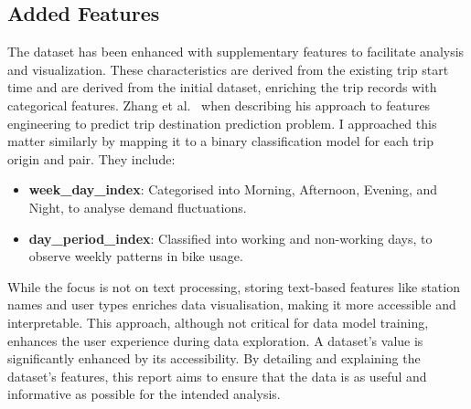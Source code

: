 \subsection{Added Features}\label{subsec:added-features}
The dataset has been enhanced with supplementary features to facilitate analysis and visualization. These characteristics are derived from the existing trip start time and are derived from the initial dataset, enriching the trip records with categorical features.
Zhang et al.~\cite{2016} when describing his approach to features engineering to predict trip destination prediction problem. I approached this matter similarly by mapping it to a binary classification model for each trip origin and pair.\newline
They include:\newline

\begin{itemize}
    \item \textbf{week\_day\_index}: Categorised into Morning, Afternoon, Evening, and Night, to analyse demand fluctuations.
    \item \textbf{day\_period\_index}: Classified into working and non-working days, to observe weekly patterns in bike usage.
\end{itemize}

While the focus is not on text processing, storing text-based features like station names and user types enriches data visualisation, making it more accessible and interpretable.
This approach, although not critical for data model training, enhances the user experience during data exploration. A dataset's value is significantly enhanced by its accessibility.
By detailing and explaining the dataset's features, this report aims to ensure that the data is as useful and informative as possible for the intended analysis.
